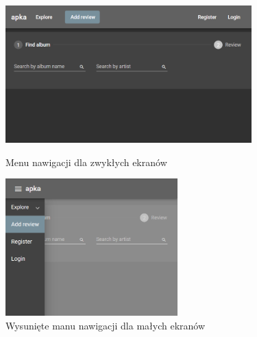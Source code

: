 		\begin{figure}[h]
			\centering
				\includegraphics[height=200px]{rys05/gt-xs.png}
			 \caption{Menu nawigacji dla zwykłych ekranów}
			 \label{fig:gt-xs}

				\includegraphics[height=200px]{rys05/xs.png}
			 \caption{Wysunięte manu nawigacji dla małych ekranów}
			 \label{fig:xs}
		\end{figure}

